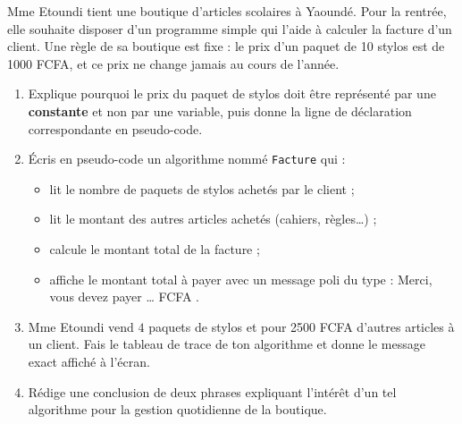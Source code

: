 \documentclass[11pt]{article}
\begin{document}
\begin{exercice}
Mme Etoundi tient une boutique d'articles scolaires à Yaoundé. Pour la rentrée, elle souhaite disposer d'un programme simple qui l'aide à calculer la facture d'un client. Une règle de sa boutique est fixe : le prix d'un paquet de 10 stylos est de \num{1000} FCFA, et ce prix ne change jamais au cours de l'année.

\begin{enumerate}
\item Explique pourquoi le prix du paquet de stylos doit être représenté par une \textbf{constante} et non par une variable, puis donne la ligne de déclaration correspondante en pseudo-code.
\item Écris en pseudo-code un algorithme nommé \texttt{Facture} qui :
\begin{itemize}
\item lit le nombre de paquets de stylos achetés par le client ;
\item lit le montant des autres articles achetés (cahiers, règles\ldots) ;
\item calcule le montant total de la facture ;
\item affiche le montant total à payer avec un message poli du type : \og Merci, vous devez payer \ldots{} FCFA \fg.
\end{itemize}
\item Mme Etoundi vend $4$ paquets de stylos et pour \num{2500} FCFA d'autres articles à un client. Fais le tableau de trace de ton algorithme et donne le message exact affiché à l'écran.
\item Rédige une conclusion de deux phrases expliquant l'intérêt d'un tel algorithme pour la gestion quotidienne de la boutique.
\end{enumerate}
\end{exercice}
\end{document}
